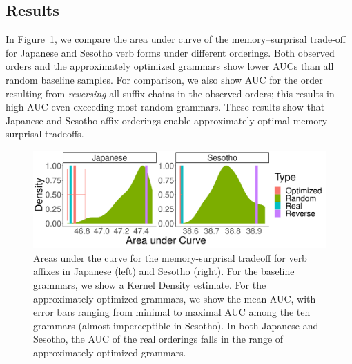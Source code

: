 \subsection{Results}
In Figure~\ref{fig:morph-auc}, we compare the area under curve of the memory--surprisal trade-off for Japanese and Sesotho verb forms under different orderings.
Both observed orders and the approximately optimized grammars show lower AUCs than all random baseline samples.
For comparison, we also show AUC for the order resulting from \emph{reversing} all suffix chains in the observed orders; this results in high AUC even exceeding most random grammars.
These results show that Japanese and Sesotho affix orderings enable approximately optimal memory-surprisal tradeoffs.



\begin{figure}
	\begin{center}
\includegraphics[width=\textwidth]{figures/Both-suffixes-byMorphemes-auc-hist-heldout.pdf}
\end{center}
	\caption{Areas under the curve for the memory-surprisal tradeoff for verb affixes in Japanese (left) and Sesotho (right). For the baseline grammars, we show a Kernel Density estimate.
	For the approximately optimized grammars, we show the mean AUC, with error bars ranging from minimal to maximal AUC among the ten grammars (almost imperceptible in Sesotho).
	In both Japanese and Sesotho, the AUC of the real orderings falls in the range of approximately optimized grammars.}
	\label{fig:morph-auc}
\end{figure}



%


